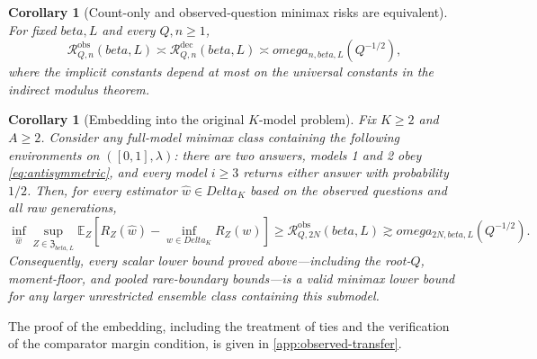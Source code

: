 \documentclass[11pt]{article}
\def\beta{beta}%
\def\omega{omega}%
\def\Delta{Delta}%
\newtheorem{corollary}[theorem]{Corollary}
\newcommand{\E}{\mathbb E}
\newcommand{\calR}{\mathcal R}
\newcommand\eed[1]{{\color{green!45!black} #1}}
\begin{document}
\begin{corollary}[Count-only and observed-question minimax risks are equivalent]
\label{cor:observed-modulus}
For fixed $\beta,L$ and every $Q,n\ge1$,
\begin{equation}
\label{eq:observed-modulus-equivalence}
\calR^{\mathrm{obs}}_{Q,n}(\beta,L)
\asymp
\calR^{\mathrm{dec}}_{Q,n}(\beta,L)
\asymp
\omega_{n,\beta,L}(Q^{-1/2}),
\end{equation}
where the implicit constants depend at most on the universal constants in the indirect modulus theorem.
\end{corollary}

\begin{corollary}[Embedding into the original $K$-model problem]
\label{cor:general-lower-transfer}
Fix $K\ge2$ and $A\ge2$.  Consider any full-model minimax class containing the following environments on $([0,1],\lambda)$: there are two answers, models 1 and 2 obey \eqref{eq:antisymmetric}, and every model $i\ge3$ returns either answer with probability $1/2$.  Then, for every estimator $\widehat w\in\Delta_K$ based on the observed questions and all raw generations,
\begin{equation}
\label{eq:general-lower-transfer}
\inf_{\widehat w}
\sup_{Z\in\mathfrak Z_{\beta,L}}
\E_Z\!
\left[
R_Z(\widehat w)-\inf_{w\in\Delta_K}R_Z(w)
\right]
\ge
\calR^{\mathrm{obs}}_{Q,2N}(\beta,L)
\gtrsim
\omega_{2N,\beta,L}(Q^{-1/2}).
\end{equation}
Consequently, every scalar lower bound proved above---including the root-$Q$, moment-floor, and pooled rare-boundary bounds---is a valid minimax lower bound for any larger unrestricted ensemble class containing this submodel.
\end{corollary}

\eed{The proof of the embedding, including the treatment of ties and the verification of the comparator margin condition, is given in \cref{app:observed-transfer}.}
\end{document}
